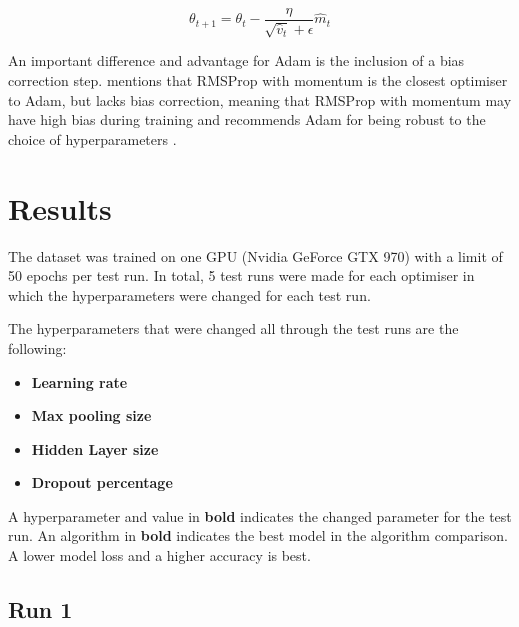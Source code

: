 \documentclass[report, 11pt, oneside]{dissertation}
\begin{document}
\begin{equation} \label{eq:16}
	\theta_{t+1} = \theta_{t} - \frac{\eta}{\sqrt{\hat{v}_t} + \epsilon} \hat{m}_t
\end{equation}

An important difference and advantage for Adam is the inclusion of a bias correction step. \citeauthor{Goodfellow-et-al-2016} mentions that RMSProp with momentum is the closest optimiser to Adam, but lacks bias correction, meaning that RMSProp with momentum may have high bias during training and recommends Adam for being robust to the choice of hyperparameters \citeyearpar[302]{Goodfellow-et-al-2016}.

\section{Results}

The dataset was trained on one GPU (Nvidia GeForce GTX 970) with a limit of 50 epochs per test run. In total, 5 test runs were made for each optimiser in which the hyperparameters were changed for each test run.

The hyperparameters that were changed all through the test runs are the following:

\begin{itemize}
  \item \textbf{Learning rate}
  \item \textbf{Max pooling size}
  \item \textbf{Hidden Layer size}
  \item \textbf{Dropout percentage}
\end{itemize}


A hyperparameter and value in \textbf{bold} indicates the changed parameter for the test run. An algorithm in \textbf{bold} indicates the best model in the algorithm comparison. A lower model loss and a higher accuracy is best.

\subsection{Run 1}
\end{document}
